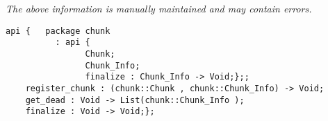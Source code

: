 \label{api:Finalize}

{\tiny \it The above information is manually maintained and may contain errors.}
\begin{verbatim}
api {   package chunk
          : api {
                Chunk;
                Chunk_Info;
                finalize : Chunk_Info -> Void;};;
    register_chunk : (chunk::Chunk , chunk::Chunk_Info) -> Void;
    get_dead : Void -> List(chunk::Chunk_Info );
    finalize : Void -> Void;};
\end{verbatim}
